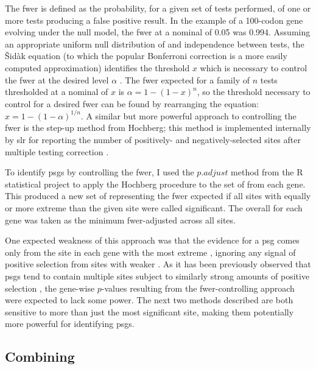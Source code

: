 The \ac{fwer} is defined as the probability, for a given set of tests
performed, of one or more tests producing a false positive result. In
the example of a 100-codon gene evolving under the null model, the
\ac{fwer} at a nominal \pv of 0.05 was 0.994. Assuming an appropriate
uniform null distribution of \pvs and independence between tests, the
\v{S}id\`{a}k equation (to which the popular Bonferroni correction is
a more easily computed approximation) identifies the \pv threshold $x$
which is necessary to control the \ac{fwer} at the desired level
$\alpha$ \citep{Sidak1967}. The \ac{fwer} expected for a family of $n$
tests thresholded at a nominal \pv of $x$ is $\alpha=1 - (1 - x)^{n}$,
so the \pv threshold necessary to control for a desired \ac{fwer} can
be found by rearranging the equation: $x=1 - (1 - \alpha)^{1/n}$. A
similar but more powerful approach to controlling the \ac{fwer} is the
step-up method from Hochberg; this method is implemented internally by
\ac{slr} for reporting the number of positively- and
negatively-selected sites after multiple testing correction
\citep{Hochberg1988,Massingham2005}.

To identify \acp{psg} by controlling the \ac{fwer}, I used the
$p.adjust$ method from the R statistical project to apply the Hochberg
procedure to the set of \sw \pvs from each gene. This produced a
new set of \pvs representing the \ac{fwer} expected if all sites
with \pvs equally or more extreme than the given site were called
significant. The overall \pv for each gene was taken as the
minimum \ac{fwer}-adjusted \pv across all sites.

One expected weakness of this approach was that the evidence for a
\ac{psg} comes only from the site in each gene with the most extreme
\slrt, ignoring any signal of positive selection from sites with
weaker \pvs. As it has been previously observed that \acp{psg}
tend to contain multiple sites subject to similarly strong amounts of
positive selection \citep{Sawyer2005a,Kosiol2008}, the gene-wise
$p$-values resulting from the \ac{fwer}-controlling approach were
expected to lack some power. The next two methods described are both
sensitive to more than just the most significant site, making them
potentially more powerful for identifying \acp{psg}.

\subsection{Combining \pvs}

